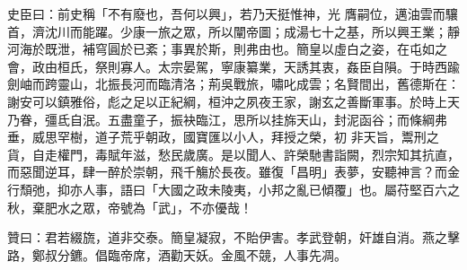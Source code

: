 \begin{pinyinscope}
 史臣曰：前史稱「不有廢也，吾何以興」，若乃天挺惟神，光
 膺嗣位，邁油雲而驤首，濟沈川而能躍。少康一旅之眾，所以闡帝圖；成湯七十之基，所以興王業；靜河海於既泄，補穹圓於已紊；事異於斯，則弗由也。簡皇以虛白之姿，在屯如之會，政由桓氏，祭則寡人。太宗晏駕，寧康纂業，天誘其衷，姦臣自隕。于時西踰劍岫而跨靈山，北振長河而臨清洛；荊吳戰旅，嘯叱成雲；名賢間出，舊德斯在：謝安可以鎮雅俗，彪之足以正紀綱，桓沖之夙夜王家，謝玄之善斷軍事。於時上天乃眷，彊氐自泯。五盡童子，振袂臨江，思所以挂旆天山，封泥函谷；而條綱弗垂，威思罕樹，道子荒乎朝政，國寶匯以小人，拜授之榮，初
 非天旨，鬻刑之貨，自走權門，毒賦年滋，愁民歲廣。是以聞人、許榮馳書詣闕，烈宗知其抗直，而惡聞逆耳，肆一醉於崇朝，飛千觴於長夜。雖復「昌明」表夢，安聽神言？而金行頹弛，抑亦人事，語曰「大國之政未陵夷，小邦之亂已傾覆」也。屬苻堅百六之秋，棄肥水之眾，帝號為「武」，不亦優哉！



 贊曰：君若綴旒，道非交泰。簡皇凝寂，不貽伊害。孝武登朝，奸雄自消。燕之擊路，鄭叔分鑣。倡臨帝席，酒勸天妖。金風不競，人事先凋。



\end{pinyinscope}